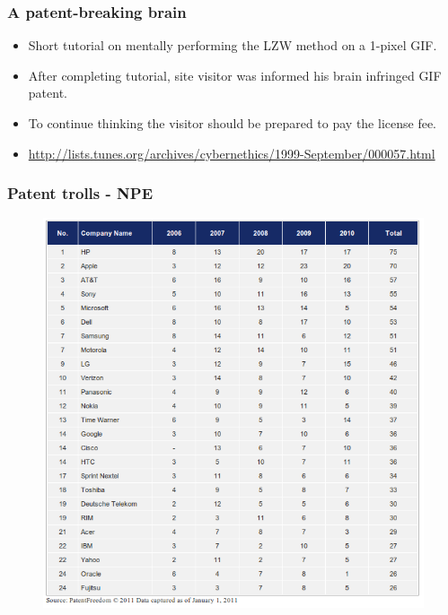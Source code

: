 \documentclass{beamer}
\begin{document}
\begin{frame}
\frametitle{A patent-breaking brain}

\begin{itemize}
\item Short tutorial on mentally performing the LZW method on a 1-pixel GIF.
\item After completing tutorial, site visitor was informed his brain infringed GIF patent.
\item To continue thinking the visitor should be prepared to pay the license fee.
\item \url{http://lists.tunes.org/archives/cybernethics/1999-September/000057.html}
\end{itemize}                                                 

\end{frame}



\begin{frame}
\frametitle{Patent trolls - NPE}

\begin{figure}
 \vspace{-0.3cm}
\begin{center}
	\includegraphics[scale=0.35,clip=true]{figs/patent-trolls.png}
\end{center}
\end{figure}

\end{frame}
\end{document}

